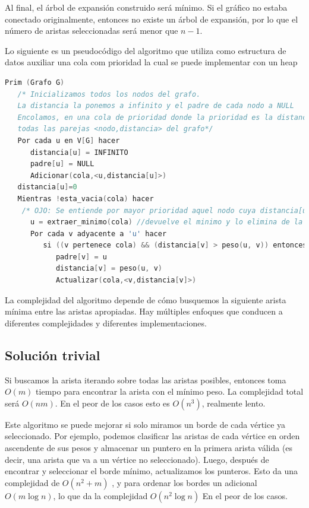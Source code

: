 Al final, el árbol de expansión construido será mínimo. Si el gráfico no estaba conectado originalmente, entonces no existe un árbol de expansión, por lo que el número de aristas seleccionadas será menor que $n-1$.

Lo siguiente es un pseudocódigo del algoritmo que utiliza como estructura de datos auxiliar una cola com prioridad la cual se puede implementar con un heap

\begin{lstlisting}[language=C++]
Prim (Grafo G)
   /* Inicializamos todos los nodos del grafo. 
   La distancia la ponemos a infinito y el padre de cada nodo a NULL
   Encolamos, en una cola de prioridad donde la prioridad es la distancia, 
   todas las parejas <nodo,distancia> del grafo*/
   Por cada u en V[G] hacer
      distancia[u] = INFINITO
      padre[u] = NULL
      Adicionar(cola,<u,distancia[u]>)
   distancia[u]=0
   Mientras !esta_vacia(cola) hacer
	/* OJO: Se entiende por mayor prioridad aquel nodo cuya distancia[u] es menor.*/
      u = extraer_minimo(cola) //devuelve el minimo y lo elimina de la cola.
      Por cada v adyacente a 'u' hacer
         si ((v pertenece cola) && (distancia[v] > peso(u, v)) entonces
            padre[v] = u
            distancia[v] = peso(u, v)
            Actualizar(cola,<v,distancia[v]>)
\end{lstlisting} 

La complejidad del algoritmo depende de cómo busquemos la siguiente arista mínima entre las aristas apropiadas. Hay múltiples enfoques que conducen a diferentes complejidades y diferentes implementaciones.

\subsection{Solución trivial}
Si buscamos la arista iterando sobre todas las aristas posibles, entonces toma $O(m)$ tiempo para encontrar la arista con el mínimo peso. La complejidad total será $O(nm)$. En el peor de los casos esto es $O(n^3)$, realmente lento.

Este algoritmo se puede mejorar si solo miramos un borde de cada vértice ya 
seleccionado. Por ejemplo, podemos clasificar las aristas de cada vértice en 
orden ascendente de sus pesos y almacenar un puntero en la primera arista válida 
(es decir, una arista que va a un vértice no seleccionado). Luego, después de 
encontrar y seleccionar el borde mínimo, actualizamos los punteros. Esto da una 
complejidad de $O(n^2 + m)$ , y para ordenar los bordes un adicional
$O(m \log n)$, lo que da la complejidad $O(n^2 \log n)$ En el peor de los casos.


